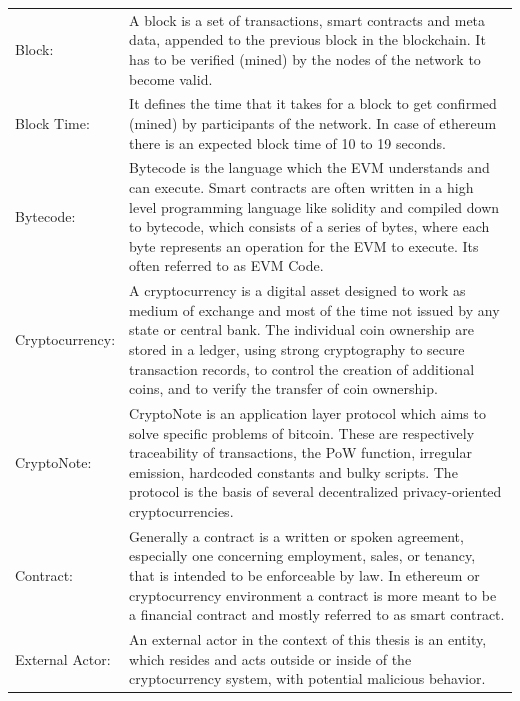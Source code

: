 \begin{center}
	\begin{tabular}{ p{4cm} p{8cm} }
		Block: & A block is a set of transactions, smart contracts and meta data, appended to the previous block in the blockchain. It has to be verified (mined) by the nodes of the network to become valid. \\
		Block Time: & It defines the time that it takes for a block to get confirmed (mined) by participants of the network. In case of ethereum there is an expected block time of 10 to 19 seconds. \\
		Bytecode: & Bytecode is the language which the \ac{EVM} understands and can execute. Smart contracts are often written in a high level programming language like solidity and compiled down to bytecode, which consists of a series of bytes, where each byte represents an operation for the \ac{EVM} to execute. Its often referred to as \ac{EVM Code}. \\
		Cryptocurrency: & A cryptocurrency is a digital asset designed to work as medium of exchange and most of the time not issued by any state or central bank. The individual coin ownership are stored in a ledger, using strong cryptography to secure transaction records, to control the creation of additional coins, and to verify the transfer of coin ownership. \\
		CryptoNote: & CryptoNote is an application layer protocol which aims to solve specific problems of bitcoin. These are respectively traceability of transactions, the \ac{PoW} function, irregular emission, hardcoded constants and bulky scripts. The protocol is the basis of several decentralized privacy-oriented cryptocurrencies. \\
		Contract:  & Generally a contract is a written or spoken agreement, especially one concerning employment, sales, or tenancy, that is intended to be enforceable by law. In ethereum or cryptocurrency environment a contract is more meant to be a financial contract and mostly referred to as smart contract. \\
		External Actor: & An external actor in the context of this thesis is an entity, which resides and acts outside or inside of the cryptocurrency system, with potential malicious behavior. \\
	\end{tabular}
\end{center}

\clearpage

